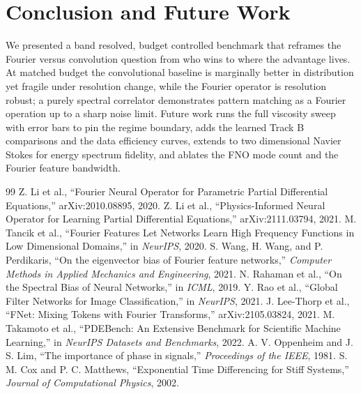 \documentclass[conference]{IEEEtran}
\begin{document}
\section{Conclusion and Future Work}
We presented a band resolved, budget controlled benchmark that reframes the Fourier versus convolution question from who wins to where the advantage lives. At matched budget the convolutional baseline is marginally better in distribution yet fragile under resolution change, while the Fourier operator is resolution robust; a purely spectral correlator demonstrates pattern matching as a Fourier operation up to a sharp noise limit. Future work runs the full viscosity sweep with error bars to pin the regime boundary, adds the learned Track B comparisons and the data efficiency curves, extends to two dimensional Navier Stokes for energy spectrum fidelity, and ablates the FNO mode count and the Fourier feature bandwidth.

\clearpage
\begin{thebibliography}{99}
 Z. Li et al., ``Fourier Neural Operator for Parametric Partial Differential Equations,'' arXiv:2010.08895, 2020.
 Z. Li et al., ``Physics-Informed Neural Operator for Learning Partial Differential Equations,'' arXiv:2111.03794, 2021.
 M. Tancik et al., ``Fourier Features Let Networks Learn High Frequency Functions in Low Dimensional Domains,'' in \emph{NeurIPS}, 2020.
 S. Wang, H. Wang, and P. Perdikaris, ``On the eigenvector bias of Fourier feature networks,'' \emph{Computer Methods in Applied Mechanics and Engineering}, 2021.
 N. Rahaman et al., ``On the Spectral Bias of Neural Networks,'' in \emph{ICML}, 2019.
 Y. Rao et al., ``Global Filter Networks for Image Classification,'' in \emph{NeurIPS}, 2021.
 J. Lee-Thorp et al., ``FNet: Mixing Tokens with Fourier Transforms,'' arXiv:2105.03824, 2021.
 M. Takamoto et al., ``PDEBench: An Extensive Benchmark for Scientific Machine Learning,'' in \emph{NeurIPS Datasets and Benchmarks}, 2022.
 A. V. Oppenheim and J. S. Lim, ``The importance of phase in signals,'' \emph{Proceedings of the IEEE}, 1981.
 S. M. Cox and P. C. Matthews, ``Exponential Time Differencing for Stiff Systems,'' \emph{Journal of Computational Physics}, 2002.
\end{thebibliography}
\end{document}
